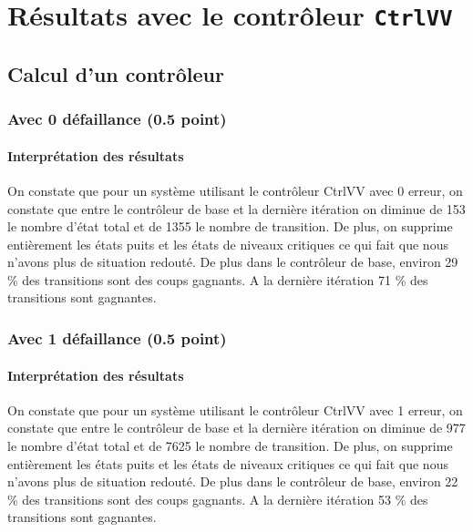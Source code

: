 \documentclass[a4paper]{book}
\begin{document}
\section{Résultats avec le contrôleur {\tt CtrlVV}}
\subsection{Calcul d'un contrôleur}
\subsubsection{Avec 0 défaillance (0.5 point)}



%
%
\paragraph{Interprétation des résultats}
\begin{flushleft}
    On constate que pour un système utilisant le contrôleur CtrlVV avec 0 erreur, on constate que entre le contrôleur de base et la dernière itération on diminue de 153 le nombre d'état total
    et de  1355 le nombre de transition. De plus, on supprime entièrement les états puits et les états de niveaux critiques ce qui fait que nous n'avons plus de situation redouté. 
    De plus dans le  contrôleur de base, environ 29 \% des transitions sont des coups gagnants.
    A la dernière itération 71 \% des transitions sont gagnantes.
    
\end{flushleft}

\subsubsection{Avec 1 défaillance (0.5 point)}





\paragraph{Interprétation des résultats}
\begin{flushleft}
    On constate que pour un système utilisant le contrôleur CtrlVV avec 1 erreur, on constate que entre le contrôleur de base et la dernière itération on diminue de 977 le nombre d'état total
    et de 7625 le nombre de transition. De plus, on supprime entièrement les états puits et les états de niveaux critiques ce qui fait que nous n'avons plus de situation redouté. 
    De plus dans le contrôleur de base, environ 22 \% des transitions sont des coups gagnants.
    A la dernière itération 53 \% des transitions sont gagnantes.
    
\end{flushleft}
\end{document}
